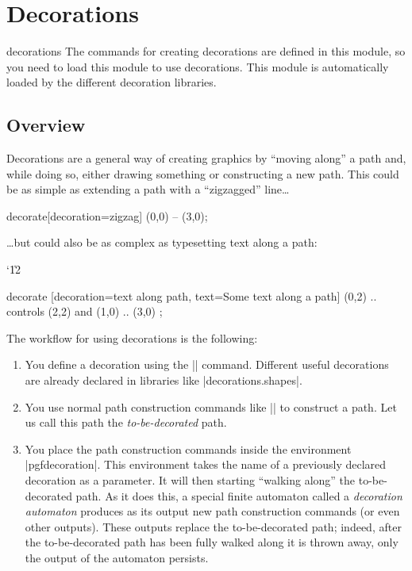 %
%
%

\section{Decorations}
\label{section-base-decorations}


\begin{pgfmodule}{decorations}
  The commands for creating decorations are defined in this
  module, so you need to load this module to use decorations. This
  module is automatically loaded by the different decoration
  libraries. 
\end{pgfmodule}


\subsection{Overview}

Decorations are a general way of creating graphics by ``moving along''
a path and, while doing so, either drawing something or constructing a
new path. This could be as simple as extending a path with a
``zigzagged'' line\ldots 

\begin{codeexample}[]
\tikz \draw decorate[decoration=zigzag] {(0,0) -- (3,0)};
\end{codeexample}
\ldots but could also be as complex as typesetting text along a path:
{\catcode`\|12
\begin{codeexample}[]
\tikz \path decorate [decoration={text along path,
     text={Some text along a path}}]
   { (0,2) .. controls (2,2) and (1,0) .. (3,0) };
\end{codeexample}
}

The workflow for using decorations is the following:
\begin{enumerate}
\item You define a decoration using the |\pgfdeclaredecoration|
  command. Different useful decorations are already declared in
  libraries like |decorations.shapes|.
\item You use normal path construction commands like |\pgfpathlineto|
  to construct a path. Let us call this path the
  \emph{to-be-decorated} path.
\item You place the path construction commands inside the environment
  |{pgfdecoration}|. This environment takes the name of a previously
  declared decoration as a parameter. It will then starting ``walking
  along'' the to-be-decorated path. As it does this, a special finite
  automaton called a \emph{decoration automaton} produces as its
  output new path construction commands (or even other outputs). These
  outputs replace the to-be-decorated path; indeed, after the
  to-be-decorated path has been fully walked along it is thrown away,
  only the output of the automaton persists.
\end{enumerate}

